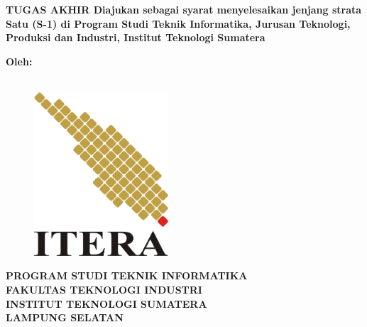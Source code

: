\clearpage
\pagestyle{empty}

\begin{center}
\smallskip
	
	\begin{center}
		\fontsize{16pt}{14pt}
		\bfseries \MakeUppercase{\thetitle}
		\vfill
	    \uppercase{Tugas Akhir}
	    \vfill
		\normalfont Diajukan sebagai syarat menyelesaikan jenjang strata Satu (S-1) di Program Studi Teknik Informatika, Jurusan Teknologi, Produksi dan Industri, Institut Teknologi Sumatera
		\vfill
	\end{center}

	\large \bfseries Oleh:\\
    \large \bfseries \theauthor\\
    \printnim
    \vfill
    
    \begin{figure}[h]
    	\centering
    	\includegraphics[width=5cm, keepaspectratio]{resources/itera-logo}
    \end{figure}
    \vfill

	\begin{center}
		\fontsize{14pt}{16pt}
	    \bfseries
	    \uppercase{
	        Program Studi Teknik Informatika \\
	        Fakultas Teknologi Industri\\
	        Institut Teknologi Sumatera\\
	        Lampung Selatan
	    }\\
	    \the\year{}
    \end{center}

\end{center}

\clearpage
